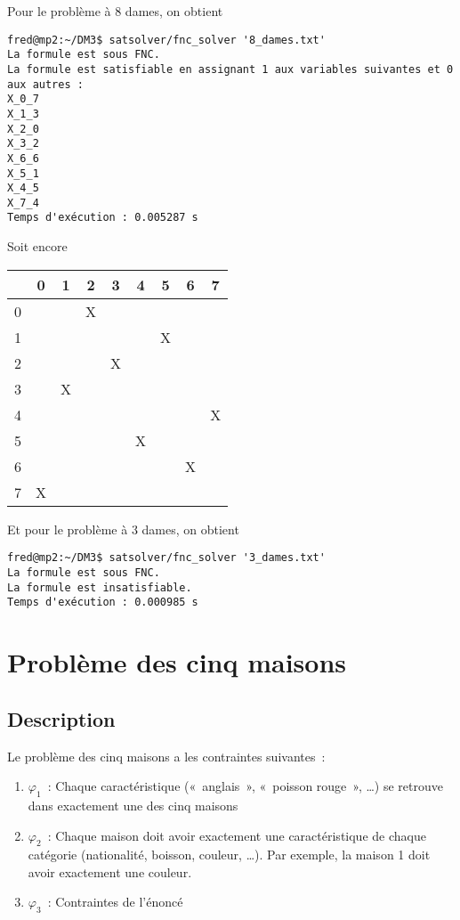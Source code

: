 Pour le problème à 8 dames, on obtient
\begin{lstlisting}
fred@mp2:~/DM3$ satsolver/fnc_solver '8_dames.txt'
La formule est sous FNC.
La formule est satisfiable en assignant 1 aux variables suivantes et 0 aux autres :
X_0_7
X_1_3
X_2_0
X_3_2
X_6_6
X_5_1
X_4_5
X_7_4
Temps d'exécution : 0.005287 s
\end{lstlisting}

Soit encore
\begin{center}
    \begin{tabular}{| c || *{8}{c |}}
    \hline
      & 0 & 1 & 2 & 3 & 4 & 5 & 6 & 7 \\
    \hline
    \hline
    0 &   &   & X &   &   &   &   &   \\
    \hline
    1 &   &   &   &   &   & X &   &   \\
    \hline
    2 &   &   &   & X &   &   &   &   \\
    \hline
    3 &   & X &   &   &   &   &   &   \\
    \hline
    4 &   &   &   &   &   &   &   & X \\
    \hline
    5 &   &   &   &   & X &   &   &   \\
    \hline
    6 &   &   &   &   &   &   & X &   \\
    \hline
    7 & X &   &   &   &   &   &   &   \\
    \hline
    \end{tabular}
\end{center}

Et pour le problème à 3 dames, on obtient
\begin{lstlisting}
fred@mp2:~/DM3$ satsolver/fnc_solver '3_dames.txt'
La formule est sous FNC.
La formule est insatisfiable.
Temps d'exécution : 0.000985 s
\end{lstlisting}


\section{Problème des cinq maisons}
\subsection{Description}
Le problème des cinq maisons a les contraintes suivantes~:
\begin{enumerate}
    \item $\varphi_1$~: Chaque caractéristique («~anglais~», «~poisson
        rouge~», …) se retrouve dans exactement une des cinq maisons
    \item $\varphi_2$~: Chaque maison doit avoir exactement une caractéristique de chaque
        catégorie (nationalité, boisson, couleur, …). Par exemple, la maison
        1 doit avoir exactement une couleur.
    \item $\varphi_3$~: Contraintes de l’énoncé
\end{enumerate}

